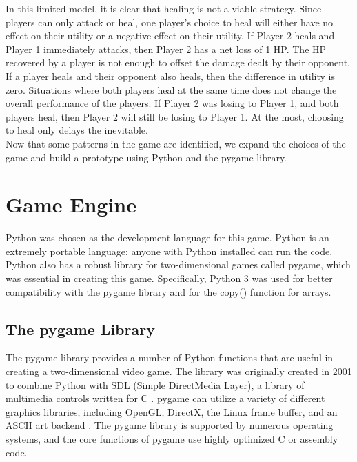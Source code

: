 In this limited model, it is clear that healing is not a viable strategy. Since players can only attack or heal, one player's choice to heal will either have no effect on their utility or a negative effect on their utility. If Player 2 heals and Player 1 immediately attacks, then Player 2 has a net loss of 1 HP. The HP recovered by a player is not enough to offset the damage dealt by their opponent. If a player heals and their opponent also heals, then the difference in utility is zero. Situations where both players heal at the same time does not change the overall performance of the players. If Player 2 was losing to Player 1, and both players heal, then Player 2 will still be losing to Player 1. At the most, choosing to heal only delays the inevitable.\\

Now that some patterns in the game are identified, we expand the choices of the game and build a prototype using Python and the pygame library.

\section{Game Engine}
Python was chosen as the development language for this game. Python is an extremely portable language: anyone with Python installed can run the code. Python also has a robust library for two-dimensional games called pygame, which was essential in creating this game. Specifically, Python 3 was used for better compatibility with the pygame library and for the copy() function for arrays.

\subsection{The pygame Library}
The pygame library provides a number of Python functions that are useful in creating a two-dimensional video game. The library was originally created in 2001 to combine Python with SDL (Simple DirectMedia Layer), a library of multimedia controls written for C \cite{shinners}. pygame can utilize a variety of different graphics libraries, including OpenGL, DirectX, the Linux frame buffer, and an ASCII art backend \cite{shinners}. The pygame library is supported by numerous operating systems, and the core functions of pygame use highly optimized C or assembly code.\\

